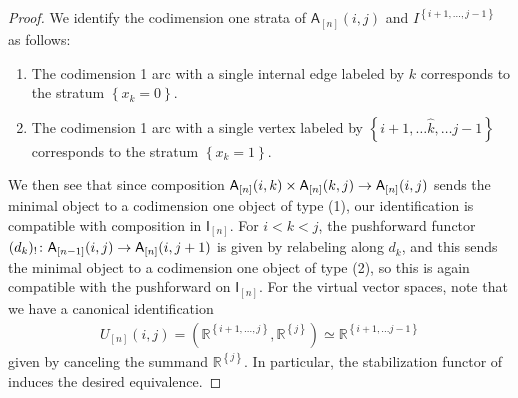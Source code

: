 \documentclass[10pt]{amsart}
\numberwithin{equation}{section}
\theoremstyle{definition}
\newcommand{\bR}{\mathbb{R}}
\newcommand{\sfA}{\mathsf{A}}
\newcommand{\sfI}{\mathsf{I}}
\renewcommand{\to}{\mathchoice{\longrightarrow}{\rightarrow}{}{}}
\begin{document}
\begin{proof}
	We identify the codimension one strata of $\sfA_{[n]}(i,j)$ and $I^{ \left\{ i+1,\dots , j-1\right\}}$ as follows:
	\begin{enumerate}
		\item The codimension 1 arc with a single internal edge labeled by $k$ corresponds to the stratum $\left\{ x_k=0 \right\}$.
		\item The codimension 1 arc with a single vertex labeled by $\left\{i+1,\dots \hat{k},\dots  j-1\right\}$ corresponds to the stratum $\left\{ x_k = 1 \right\}$.
	\end{enumerate}
	We then see that since composition $\sfA_{[n]}(i,k)\times \sfA_{[n]}(k,j)\to \sfA_{[n]}(i,j)$ sends the minimal object to a codimension one object of type (1), our identification is compatible with composition in $\sfI_{[n]}$.
	For $i<k<j$, the pushforward functor $(d_{k})_{!}\colon \sfA_{[n-1]}(i,j) \to \sfA_{[n]}(i,j+1)$ is given by relabeling along $d_{k}$, and this sends the minimal object to a codimension one object of type (2), so this is again compatible with the pushforward on $\sfI_{[n]}$.
  For the virtual vector spaces, note that we have a canonical identification
	\begin{align*}
		U_{[n]}(i,j) = \left(\bR^{ \left\{ i+1, \dots , j\right\}}, \bR^{ \left\{ j\right\}} \right) \simeq \bR^{ \left\{ i+1,\dots j-1 \right\} }
	\end{align*}
	given by canceling the summand $\bR^{ \left\{ j\right\}}$.
  In particular, the stabilization functor of  induces the desired equivalence.
\end{proof}
\end{document}
